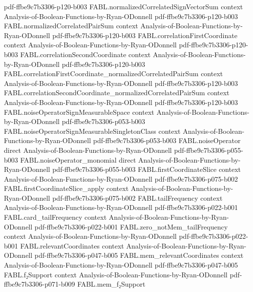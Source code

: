 \begin{theorem}
  {pdf-ffbe9c7b3306-p120-b003}
\proofstep
  {FABL.normalizedCorrelatedSignVectorSum}
  {context}
  {Analysis-of-Boolean-Functions-by-Ryan-ODonnell}
  {pdf-ffbe9c7b3306-p120-b003}
\proofstep
  {FABL.normalizedCorrelatedPairSum}
  {context}
  {Analysis-of-Boolean-Functions-by-Ryan-ODonnell}
  {pdf-ffbe9c7b3306-p120-b003}
\proofstep
  {FABL.correlationFirstCoordinate}
  {context}
  {Analysis-of-Boolean-Functions-by-Ryan-ODonnell}
  {pdf-ffbe9c7b3306-p120-b003}
\proofstep
  {FABL.correlationSecondCoordinate}
  {context}
  {Analysis-of-Boolean-Functions-by-Ryan-ODonnell}
  {pdf-ffbe9c7b3306-p120-b003}
\proofstep
  {FABL.correlationFirstCoordinate_normalizedCorrelatedPairSum}
  {context}
  {Analysis-of-Boolean-Functions-by-Ryan-ODonnell}
  {pdf-ffbe9c7b3306-p120-b003}
\proofstep
  {FABL.correlationSecondCoordinate_normalizedCorrelatedPairSum}
  {context}
  {Analysis-of-Boolean-Functions-by-Ryan-ODonnell}
  {pdf-ffbe9c7b3306-p120-b003}
\proofstep
  {FABL.noiseOperatorSignMeasurableSpace}
  {context}
  {Analysis-of-Boolean-Functions-by-Ryan-ODonnell}
  {pdf-ffbe9c7b3306-p053-b003}
\proofstep
  {FABL.noiseOperatorSignMeasurableSingletonClass}
  {context}
  {Analysis-of-Boolean-Functions-by-Ryan-ODonnell}
  {pdf-ffbe9c7b3306-p053-b003}
\proofstep
  {FABL.noiseOperator}
  {direct}
  {Analysis-of-Boolean-Functions-by-Ryan-ODonnell}
  {pdf-ffbe9c7b3306-p055-b003}
\proofstep
  {FABL.noiseOperator_monomial}
  {direct}
  {Analysis-of-Boolean-Functions-by-Ryan-ODonnell}
  {pdf-ffbe9c7b3306-p055-b003}
\proofstep
  {FABL.firstCoordinateSlice}
  {context}
  {Analysis-of-Boolean-Functions-by-Ryan-ODonnell}
  {pdf-ffbe9c7b3306-p075-b002}
\proofstep
  {FABL.firstCoordinateSlice_apply}
  {context}
  {Analysis-of-Boolean-Functions-by-Ryan-ODonnell}
  {pdf-ffbe9c7b3306-p075-b002}
\proofstep
  {FABL.tailFrequency}
  {context}
  {Analysis-of-Boolean-Functions-by-Ryan-ODonnell}
  {pdf-ffbe9c7b3306-p022-b001}
\proofstep
  {FABL.card_tailFrequency}
  {context}
  {Analysis-of-Boolean-Functions-by-Ryan-ODonnell}
  {pdf-ffbe9c7b3306-p022-b001}
\proofstep
  {FABL.zero_notMem_tailFrequency}
  {context}
  {Analysis-of-Boolean-Functions-by-Ryan-ODonnell}
  {pdf-ffbe9c7b3306-p022-b001}
\proofstep
  {FABL.relevantCoordinates}
  {context}
  {Analysis-of-Boolean-Functions-by-Ryan-ODonnell}
  {pdf-ffbe9c7b3306-p047-b005}
\proofstep
  {FABL.mem_relevantCoordinates}
  {context}
  {Analysis-of-Boolean-Functions-by-Ryan-ODonnell}
  {pdf-ffbe9c7b3306-p047-b005}
\proofstep
  {FABL.f₂Support}
  {context}
  {Analysis-of-Boolean-Functions-by-Ryan-ODonnell}
  {pdf-ffbe9c7b3306-p071-b009}
\proofstep
  {FABL.mem_f₂Support}

\end{theorem}
